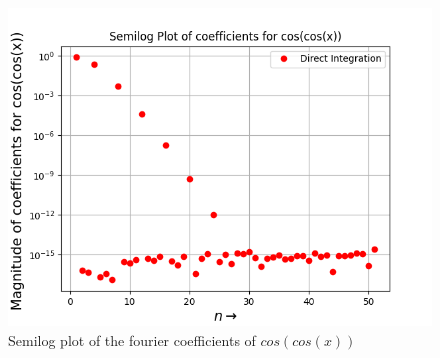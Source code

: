 \documentclass[11pt, a4paper]{article}
\begin{document}
	\begin{figure}[!tbh]
   	\centering
   	\includegraphics[scale=0.5]{Ass4_Figure_5.png}   
   	\caption{Semilog plot of the fourier coefficients of $cos(cos(x))$}
   	\label{fig:sample}
   \end{figure} 
\end{document}

